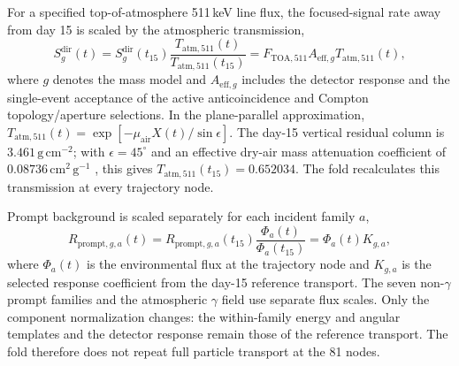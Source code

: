 \documentclass[11pt]{article}
\newcommand{\revblue}[1]{\textcolor{revisionblue}{#1}}
\begin{document}
For a specified top-of-atmosphere 511\,keV line flux, the focused-signal rate
away from day 15 is scaled by the atmospheric transmission,
\begin{equation}
 S^{\mathrm{dir}}_g(t)
 =S^{\mathrm{dir}}_g(t_{15})
 \frac{T_{\mathrm{atm},511}(t)}{T_{\mathrm{atm},511}(t_{15})}
 =F_{\mathrm{TOA},511}A_{\mathrm{eff},g}T_{\mathrm{atm},511}(t),
 \label{eq:mission_signal}
\end{equation}
where $g$ denotes the mass model and $A_{\mathrm{eff},g}$ includes the detector
response and the single-event acceptance of the active anticoincidence and
Compton topology/aperture selections. In the plane-parallel approximation,
$T_{\mathrm{atm},511}(t)=\exp[-\mu_{\mathrm{air}}X(t)/\sin\epsilon]$. The
day-15 vertical residual column is $3.461\,\mathrm{g\,cm^{-2}}$; with
$\epsilon=45^\circ$ and an effective dry-air mass attenuation coefficient of
$0.08736\,\mathrm{cm^2\,g^{-1}}$ \cite{NISTXCOM}, this gives
$T_{\mathrm{atm},511}(t_{15})=0.652034$. The fold recalculates this transmission
at every trajectory node.

Prompt background is scaled separately for each incident family $a$,
\begin{equation}
 R_{\mathrm{prompt},g,a}(t)
 =R_{\mathrm{prompt},g,a}(t_{15})
 \frac{\Phi_a(t)}{\Phi_a(t_{15})}
 =\Phi_a(t)K_{g,a},
 \label{eq:prompt_source_response}
\end{equation}
where $\Phi_a(t)$ is the environmental flux at the trajectory node and
$K_{g,a}$ is the selected response coefficient from the day-15 reference
transport. The seven non-$\gamma$ prompt families and the \revblue{atmospheric
$\gamma$ field} use separate flux scales. Only the component normalization
changes: the within-family energy and angular templates and the detector
response remain those of the reference transport. The fold therefore does not
repeat full particle transport at the 81 nodes.
\end{document}

